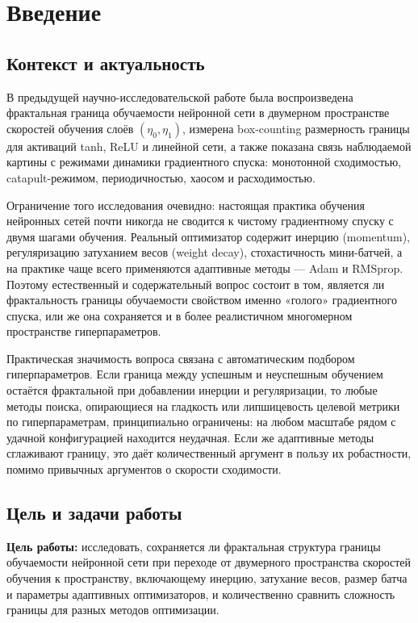 \section{Введение}

\subsection{Контекст и актуальность}

В предыдущей научно-исследовательской работе была воспроизведена фрактальная
граница обучаемости нейронной сети в двумерном пространстве скоростей обучения
слоёв $(\eta_0,\eta_1)$, измерена box-counting размерность границы для активаций
tanh, ReLU и линейной сети, а также показана связь наблюдаемой картины с режимами
динамики градиентного спуска: монотонной сходимостью, catapult-режимом,
периодичностью, хаосом и расходимостью.

Ограничение того исследования очевидно: настоящая практика обучения нейронных
сетей почти никогда не сводится к чистому градиентному спуску с двумя шагами
обучения. Реальный оптимизатор содержит инерцию (momentum), регуляризацию
затуханием весов (weight decay), стохастичность мини-батчей, а на практике чаще
всего применяются адаптивные методы --- Adam и RMSprop. Поэтому естественный и
содержательный вопрос состоит в том, является ли фрактальность границы
обучаемости свойством именно «голого» градиентного спуска, или же она сохраняется
и в более реалистичном многомерном пространстве гиперпараметров.

Практическая значимость вопроса связана с автоматическим подбором
гиперпараметров. Если граница между успешным и неуспешным обучением остаётся
фрактальной при добавлении инерции и регуляризации, то любые методы поиска,
опирающиеся на гладкость или липшицевость целевой метрики по гиперпараметрам,
принципиально ограничены: на любом масштабе рядом с удачной конфигурацией
находится неудачная. Если же адаптивные методы сглаживают границу, это даёт
количественный аргумент в пользу их робастности, помимо привычных аргументов
о скорости сходимости.

\subsection{Цель и задачи работы}

\textbf{Цель работы:} исследовать, сохраняется ли фрактальная структура границы
обучаемости нейронной сети при переходе от двумерного пространства скоростей
обучения к пространству, включающему инерцию, затухание весов, размер батча и
параметры адаптивных оптимизаторов, и количественно сравнить сложность границы
для разных методов оптимизации.


